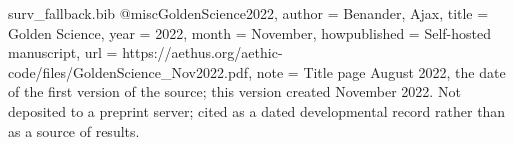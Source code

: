 \begin{filecontents}[overwrite]{surv_fallback.bib}
@misc{GoldenScience2022,
  author       = {Benander, Ajax},
  title        = {Golden Science},
  year         = {2022},
  month        = {November},
  howpublished = {Self-hosted manuscript},
  url          = {https://aethus.org/aethic-code/files/GoldenScience_Nov2022.pdf},
  note         = {Title page August 2022, the date of the first version of the source; this version created November 2022. Not deposited to a
                  preprint server; cited as a dated developmental record rather than
                  as a source of results.}
}
\end{filecontents}
